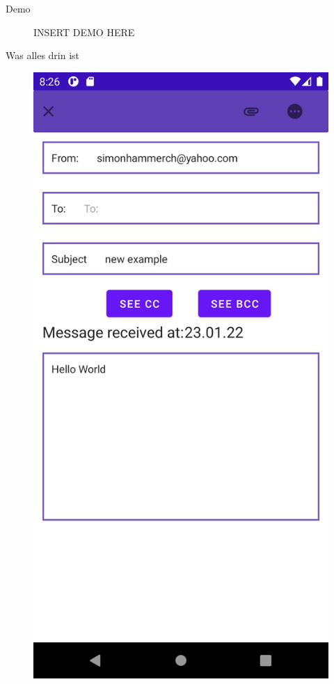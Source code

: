 \documentclass[aspectratio=169]{beamer}
\begin{document}
\begin{frame}{Demo}
    \begin{figure}[h]
        \centering
        INSERT DEMO HERE
    \end{figure}
\end{frame}

\begin{frame}{Was alles drin ist}
    \begin{figure}[h]\pause
        \includegraphics[height=.8\textheight]{media/emailViewer.jpg}

\end{figure}
\end{frame}
\end{document}
